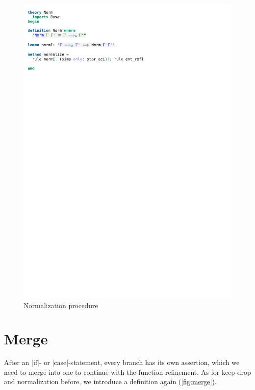 \begin{figure}[htpb]
    \includegraphics[trim={0 23,9cm 0 3,9cm}, clip, width=1.00\textwidth]{figures/Theory_Norm.pdf}
    \caption[Normalization procedure]{Normalization procedure}
    \label{fig:norm_procedure}
\end{figure}

\section{Merge}

After an |if|- or |case|-statement, every branch has its own assertion, which we need to merge into one to continue with the function refinement. As for keep-drop and normalization before, we introduce a definition again (\autoref{fig:merge}).

